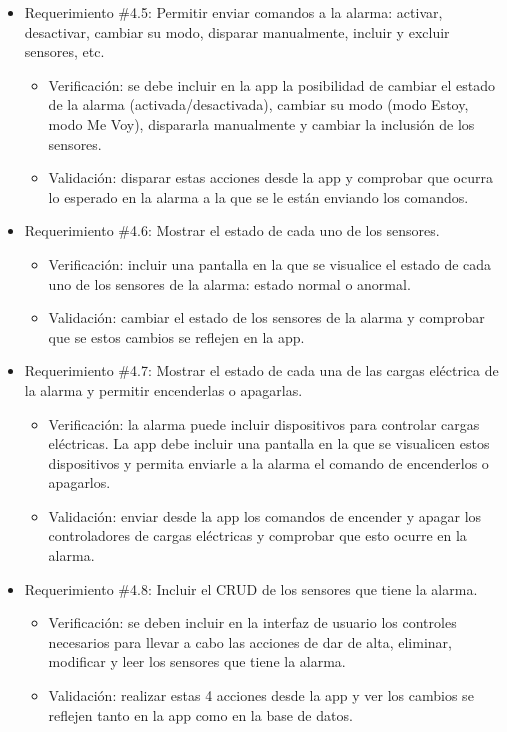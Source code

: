\documentclass[
11pt, %
codirector, %
]{charter}
\begin{document}
\begin{itemize}
	\item Requerimiento \#4.5: Permitir enviar comandos a la alarma: activar, desactivar, cambiar su modo, disparar manualmente, incluir y excluir sensores, etc.
	\begin{itemize}
		\item Verificación: se debe incluir en la app la posibilidad de cambiar el estado de la alarma (activada/desactivada), cambiar su modo (modo Estoy, modo Me Voy), dispararla manualmente y cambiar la inclusión de los sensores.
		\item Validación: disparar estas acciones desde la app y comprobar que ocurra lo esperado en la alarma a la que se le están enviando los comandos.
	\end{itemize}
			
	\item Requerimiento \#4.6: Mostrar el estado de cada uno de los sensores.
	\begin{itemize}
		\item Verificación: incluir una pantalla en la que se visualice el estado de cada uno de los sensores de la alarma: estado normal o anormal.
		\item Validación: cambiar el estado de los sensores de la alarma y comprobar que se estos cambios se reflejen en la app.
	\end{itemize}
			
	\item Requerimiento \#4.7: Mostrar el estado de cada una de las cargas eléctrica de la alarma y permitir encenderlas o apagarlas.
	\begin{itemize}
		\item Verificación: la alarma puede incluir dispositivos para controlar cargas eléctricas. La app debe incluir una pantalla en la que se visualicen estos dispositivos y permita enviarle a la alarma el comando de encenderlos o apagarlos.
		\item Validación: enviar desde la app los comandos de encender y apagar los controladores de cargas eléctricas y comprobar que esto ocurre en la alarma.
	\end{itemize}
			
	\item Requerimiento \#4.8: Incluir el CRUD de los sensores que tiene la alarma.
	\begin{itemize}
		\item Verificación: se deben incluir en la interfaz de usuario los controles necesarios  para llevar a cabo las acciones de dar de alta, eliminar, modificar y leer los sensores que tiene la alarma.
		\item Validación: realizar estas 4 acciones desde la app y ver los cambios se reflejen tanto en la app como en la base de datos.
	\end{itemize}
			

\end{itemize}
\end{document}
